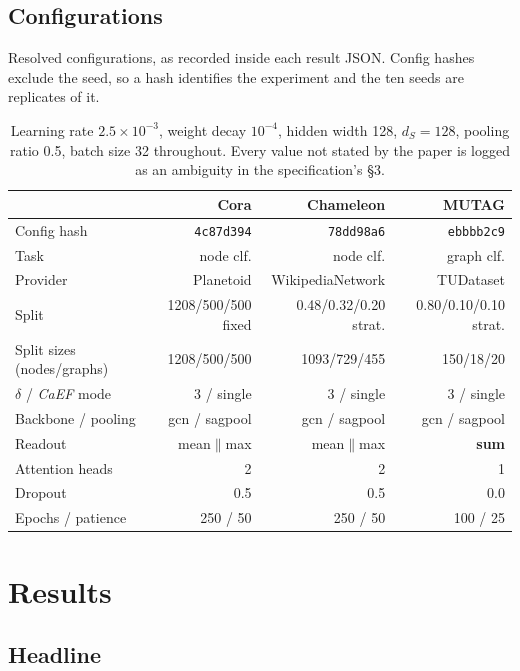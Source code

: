 \documentclass[11pt,a4paper]{article}
\newcommand{\caef}{\textit{CaEF}}
\begin{document}
\subsection{Configurations}

Resolved configurations, as recorded inside each result JSON. Config hashes exclude the seed, so a
hash identifies the experiment and the ten seeds are replicates of it.

\begin{table}[!htbp]
\centering
\begin{tabular}{lrrr}
\toprule
 & Cora & Chameleon & MUTAG \\
\midrule
Config hash & \texttt{4c87d394} & \texttt{78dd98a6} & \texttt{ebbbb2c9} \\
Task & node clf. & node clf. & graph clf. \\
Provider & Planetoid & WikipediaNetwork & TUDataset \\
Split & 1208/500/500 fixed & 0.48/0.32/0.20 strat. & 0.80/0.10/0.10 strat. \\
Split sizes (nodes/graphs) & 1208/500/500 & 1093/729/455 & 150/18/20 \\
$\delta$ / \caef{} mode & 3 / single & 3 / single & 3 / single \\
Backbone / pooling & gcn / sagpool & gcn / sagpool & gcn / sagpool \\
Readout & mean$\|$max & mean$\|$max & \textbf{sum} \\
Attention heads & 2 & 2 & 1 \\
Dropout & 0.5 & 0.5 & 0.0 \\
Epochs / patience & 250 / 50 & 250 / 50 & 100 / 25 \\
\bottomrule
\end{tabular}
\caption{Learning rate $2.5\times10^{-3}$, weight decay $10^{-4}$, hidden width 128, $d_S=128$,
pooling ratio 0.5, batch size 32 throughout. Every value not stated by the paper is logged as an
ambiguity in the specification's \S3.}
\end{table}

\section{Results}

\subsection{Headline}
\end{document}
